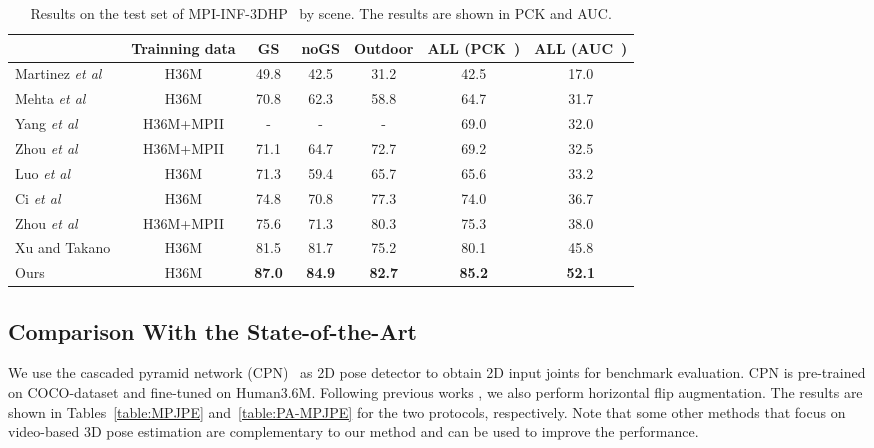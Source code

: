 \documentclass{bmvc2k}
\def\etal{\emph{et al}\bmvaOneDot}
\begin{document}
\begin{table}[!t]
\small
\centering
\setlength{\tabcolsep}{0.6pt}
\setlength{\abovecaptionskip}{-8pt}
\setlength{\belowcaptionskip}{2pt}
 \caption{Results on the test set of MPI-INF-3DHP~\cite{mehta2017monocular}  by scene.  The results are shown in PCK and AUC.}\label{table:MPI} \begin{tabular}{l|c |ccc|cc}
         \hline
        &Trainning data &~GS~& noGS &Outdoor &ALL (PCK~) &ALL (AUC~)\\ \hline \hline
        Martinez \etal~\cite{2017simple} &H36M &49.8&42.5&31.2&42.5&17.0\\
        Mehta \etal~\cite{mehta2017monocular} &H36M&70.8&62.3&58.8&64.7&31.7\\
        Yang \etal~\cite{yang20183d} &H36M+MPII&-&-&-&69.0&32.0\\
        Zhou \etal~\cite{zhou2017towards} &H36M+MPII&71.1&64.7&72.7&69.2&32.5\\
        Luo \etal~\cite{luo2018orinet}  &H36M&71.3&59.4&65.7&65.6&33.2\\
        Ci \etal~\cite{ci2019optimizing} &H36M&74.8&70.8&77.3&74.0&36.7\\
        Zhou \etal~\cite{zhou2019hemlets} &H36M+MPII &75.6&71.3&80.3&75.3&38.0\\
        Xu and Takano~\cite{2021Graph}    &H36M &81.5&81.7&75.2&80.1&45.8\\ \hline
Ours&H36M& \textbf{87.0}&\textbf{84.9}&\textbf{82.7}&\textbf{85.2}&\textbf{52.1}\\ \hline
        \end{tabular}
\vspace{-10pt}
\end{table}


\subsection{Comparison With the State-of-the-Art}
We use the cascaded pyramid network (CPN)~\cite{chen2018cascaded} as 2D pose detector to obtain 2D input joints for benchmark evaluation. CPN is pre-trained on COCO-dataset and fine-tuned on Human3.6M. Following previous works  \cite{pavllo20193d,zhou2017towards,2019Exploiting}, we also perform horizontal flip augmentation. The results are shown in Tables~\ref{table:MPJPE} and~\ref{table:PA-MPJPE} for the two protocols, respectively. Note that some other methods \cite{pavllo20193d,2019Exploiting} that focus on video-based 3D pose estimation are complementary to our method and can be used to improve the performance.
\end{document}
